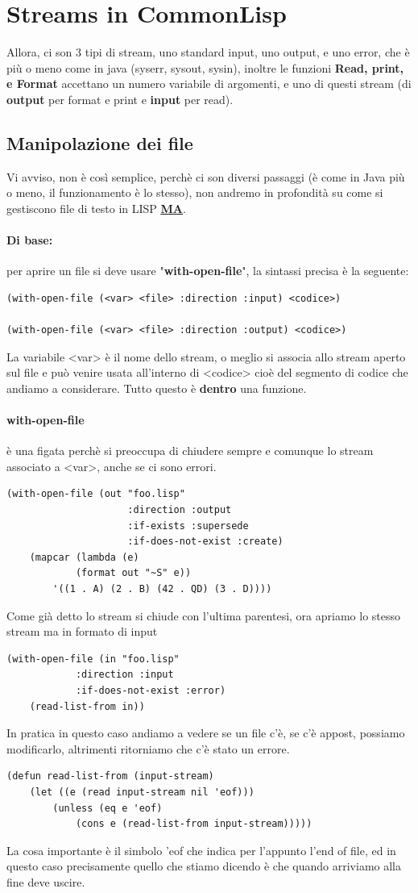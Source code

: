 \documentclass[12pt, a4paper, openany, oneside]{book}
\begin{document}
\section{Streams in CommonLisp}
Allora, ci son 3 tipi di stream, uno standard input, uno output, e uno error, che 
è più o meno come in java (syserr, sysout, sysin), inoltre le funzioni \textbf{Read,
print, e Format} accettano un numero variabile di argomenti, e uno di questi 
stream (di \textbf{output} per format e print e \textbf{input} per read).
\subsection{Manipolazione dei file}
Vi avviso, non è così semplice, perchè ci son diversi passaggi (è come in Java
più o meno, il funzionamento è lo stesso), non andremo in profondità su come si
gestiscono file di testo in LISP \underline{\underline{\textbf{MA}}}.
\paragraph{Di base:} per aprire un file si deve usare "\textbf{with-open-file}",
la sintassi precisa è la seguente: 
\begin{lstlisting}[language=LISP]
(with-open-file (<var> <file> :direction :input) <codice>)

(with-open-file (<var> <file> :direction :output) <codice>)
\end{lstlisting}
La variabile <var> è il nome dello stream, o meglio si associa allo stream aperto
sul file e può venire usata all'interno di <codice> cioè del segmento di codice
che andiamo a considerare. Tutto questo è \textbf{dentro} una funzione.
\paragraph{with-open-file} è una figata perchè si preoccupa di chiudere sempre e 
comunque lo stream associato a <var>, anche se ci sono errori.
\begin{lstlisting}[language=LISP]
(with-open-file (out "foo.lisp" 
					 :direction :output
					 :if-exists :supersede
					 :if-does-not-exist :create) 
	(mapcar (lambda (e)
			(format out "~S" e))
		'((1 . A) (2 . B) (42 . QD) (3 . D))))
\end{lstlisting}
Come già detto lo stream si chiude con l'ultima parentesi, ora apriamo lo stesso
stream ma in formato di input
\begin{lstlisting}[language=LISP]
(with-open-file (in "foo.lisp" 
			:direction :input
			:if-does-not-exist :error) 
	(read-list-from in))
\end{lstlisting}
In pratica in questo caso andiamo a vedere se un file c'è, se c'è appost, possiamo
modificarlo, altrimenti ritorniamo che c'è stato un errore.
\begin{lstlisting}[language=LISP]
(defun read-list-from (input-stream)
	(let ((e (read input-stream nil 'eof)))
		(unless (eq e 'eof)
			(cons e (read-list-from input-stream)))))
\end{lstlisting}
La cosa importante è il simbolo 'eof che indica per l'appunto l'end of file, 
ed in questo caso precisamente quello che stiamo dicendo è che quando arriviamo
alla fine deve uscire.
\end{document}
